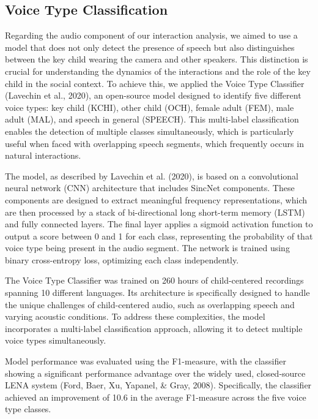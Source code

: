 \documentclass[
  man,floatsintext]{apa6}
\begin{document}
\subsection{Voice Type Classification}\label{sup-voice-type}

Regarding the audio component of our interaction analysis, we aimed to use a model that does not only detect the presence of speech but also distinguishes between the key child wearing the camera and other speakers. This distinction is crucial for understanding the dynamics of the interactions and the role of the key child in the social context. To achieve this, we applied the Voice Type Classifier (Lavechin et al., 2020), an open-source model designed to identify five different voice types: key child (KCHI), other child (OCH), female adult (FEM), male adult (MAL), and speech in general (SPEECH). This multi-label classification enables the detection of multiple classes simultaneously, which is particularly useful when faced with overlapping speech segments, which frequently occurs in natural interactions.

The model, as described by Lavechin et al. (2020), is based on a convolutional neural network (CNN) architecture that includes SincNet components. These components are designed to extract meaningful frequency representations, which are then processed by a stack of bi-directional long short-term memory (LSTM) and fully connected layers. The final layer applies a sigmoid activation function to output a score between 0 and 1 for each class, representing the probability of that voice type being present in the audio segment. The network is trained using binary cross-entropy loss, optimizing each class independently.

The Voice Type Classifier was trained on 260 hours of child-centered recordings spanning 10 different languages. Its architecture is specifically designed to handle the unique challenges of child-centered audio, such as overlapping speech and varying acoustic conditions. To address these complexities, the model incorporates a multi-label classification approach, allowing it to detect multiple voice types simultaneously.

Model performance was evaluated using the F1-measure, with the classifier showing a significant performance advantage over the widely used, closed-source LENA system (Ford, Baer, Xu, Yapanel, \& Gray, 2008). Specifically, the classifier achieved an improvement of 10.6 in the average F1-measure across the five voice type classes.
\end{document}
